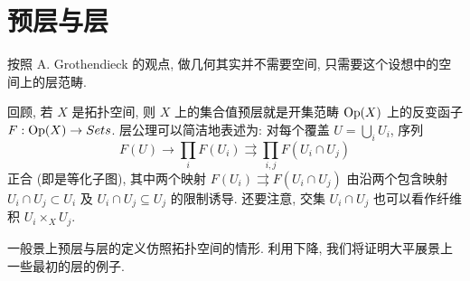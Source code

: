 \section{预层与层}\label{src:3.3}
\begin{epigraph}
按照 A. Grothendieck 的观点, 做几何其实并不需要空间, 只需要这个设想中的空间上的层范畴.
\end{epigraph}
回顾, 若 $X$ 是拓扑空间, 则 $X$ 上的集合值预层就是开集范畴 $\operatorname{Op}(X)$ 上的反变函子 $F:\operatorname{Op}(X)\to Sets$. 层公理可以简洁地表述为: 对每个覆盖 $U=\bigcup_i U_i$, 序列
\[
F(U)\longrightarrow\prod_i F(U_i)\rightrightarrows\prod_{i,j}F(U_i\cap U_j)
\]
正合 (即是等化子图), 其中两个映射 $F(U_i)\rightrightarrows F(U_i\cap U_j)$ 由沿两个包含映射 $U_i\cap U_j\subset U_i$ 及 $U_i\cap U_j\subseteq U_j$ 的限制诱导. 还要注意, 交集 $U_i\cap U_j$ 也可以看作纤维积 $U_i\times_X U_j$.

一般景上预层与层的定义仿照拓扑空间的情形. 利用下降, 我们将证明大平展景上一些最初的层的例子.
